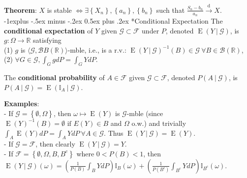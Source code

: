 \documentclass[paper=letter,fontsize=2.89mm]{scrartcl}
\makeatletter
\DeclareMathOperator{\E}{E}
\newcommand\given[1][]{\:#1\vert\:}
\newcommand{\convdist}{\stackrel{\text{d}}{\longrightarrow}}
\newcommand{\Borel}{\mathcal{B}}
\newcommand{\R}{\mathbb{R}}
\newcommand\indicate[1]{\mathbb{I}_{ #1 }}
\newcommand\set[1]{\left\{ #1 \right\}}
\renewcommand{\subsection}{\@startsection{subsection}{2}{0mm}%
                                {-1explus -.5ex minus -.2ex}%
                                {0.5ex plus .2ex}%
                                {\normalfont\normalsize\bfseries}}
\makeatother
\begin{document}
\begin{multicols*}{3}
\textbf{Theorem}: $X$ is stable $\iff \exists \set{X_n}, \set{a_n}, \set{b_n}$ such that $\frac{S_n - b_n}{a_n} \convdist X$. \\ 


\subsection*{Conditional Expectation}
The \textbf{conditional expectation} of $Y$ given $\mathcal{G} \subset \mathcal{F}$ under $P$, denoted $\E(Y \given \mathcal{G})$, is $g: \Omega \to \R$ satisfying \\
(1) $g$ is $\langle \mathcal{G}, \Borel{B}(\R) \rangle$-mble, i.e., is a r.v.: $\E(Y \given\mathcal{G})^{-1}(B) \in \mathcal{G} ~\forall B \in \Borel(\R)$, \\
(2) $\forall G \in \mathcal{G}, \int_G gdP = \int_G Y dP$. \\ \medskip

The \textbf{conditional probability} of $A \in \mathcal{F}$ given $\mathcal{G} \subset \mathcal{F}$, denoted $P(A\given\mathcal{G})$, is $P(A\given\mathcal{G}) = \E(\indicate{A} \given \mathcal{G})$. \\ \medskip

\textbf{Examples}: \\
- If $\mathcal{G} = \set{\emptyset, \Omega}$, then  $\omega \mapsto \E(Y)$ is $\mathcal{G}$-mble (since $\E(Y)^{-1}(B) = \emptyset \text{ if } E(Y) \in B$ and $\Omega$ o.w.) and trivially $\int_A \E(Y)dP = \int_A YdP ~\forall A \in \mathcal{G}$. Thus $\E(Y\given\mathcal{G}) =\E(Y).$ \\
- If $\mathcal{G} = \mathcal{F}$, then clearly $\E(Y\given\mathcal{G}) = Y$. \\
- If $\mathcal{F} = \set{\emptyset, \Omega, B, B^c}$ where $0 < P(B) < 1$, then 
$\E(Y \given \mathcal{G})(\omega) = \left( \frac{1}{P(B)} \int_B Y dP \right) \indicate{B}(\omega) + \left( \frac{1}{P(B^c)} \int_{B^c} Y dP \right) \indicate{B^c}(\omega).$ \\ \medskip


\end{multicols*}
\end{document}
